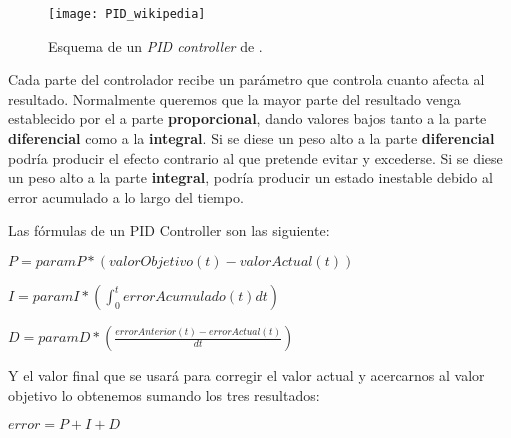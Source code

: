 \begin{figure}[htpb]
    \centering
    \texttt{[image: PID\_wikipedia]}
    \caption[Esquema de un \textit{PID controller}]{Esquema de un \textit{PID controller} de \cite{wiki:pidimagen}.}
    \label{fig:basics AFM sketch}
\end{figure}

Cada parte del controlador recibe un parámetro que controla cuanto afecta al resultado. Normalmente queremos que la mayor parte del resultado venga establecido por el a parte \textbf{proporcional}, dando valores bajos tanto a la parte \textbf{diferencial} como a la \textbf{integral}. Si se diese un peso alto a la parte \textbf{diferencial} podría producir el efecto contrario al que pretende evitar y excederse. Si se diese un peso alto a la parte \textbf{integral}, podría producir un estado inestable debido al error acumulado a lo largo del tiempo.

Las fórmulas de un PID Controller son las siguiente:
\begin{center}
$P = paramP * (valorObjetivo(t) - valorActual(t))$

$I = paramI * (\displaystyle \int_{0}^{t} errorAcumulado(t) dt)$

$D = paramD * (\displaystyle \frac{errorAnterior(t)-errorActual(t)}{dt})$
\end{center}

Y el valor final que se usará para corregir el valor actual y acercarnos al valor objetivo lo obtenemos sumando los tres resultados:
\begin{center}
$error = P + I + D$
\end{center}